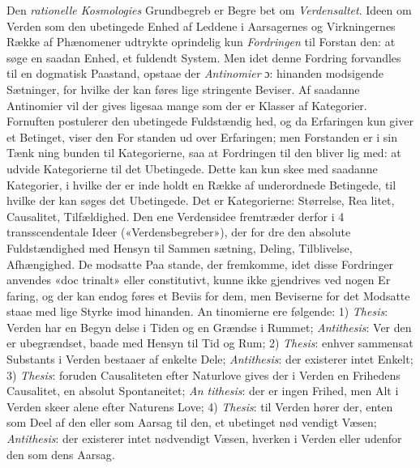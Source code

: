 \documentclass[12pt,a4paper]{book}
\begin{document}
Den \emph{rationelle Kosmologies} Grundbegreb er Begre\-%
bet om \emph{Verdensaltet}. Ideen om Verden som den ubetingede
Enhed af Leddene i Aarsagernes og Virkningernes Række af
Phænomener udtrykte oprindelig kun \emph{Fordringen} til Forstan\-%
den: at søge en saadan Enhed, et fuldendt System. Men idet
denne Fordring forvandles til en dogmatisk Paastand, opstaae
der \emph{Antinomier} ɔ: hinanden modsigende Sætninger, for
hvilke der kan føres lige stringente Beviser. Af saadanne
Antinomier vil der gives ligesaa mange som der er Klasser af
Kategorier. Fornuften postulerer den ubetingede Fuldstændig\-%
hed, og da Erfaringen kun giver et Betinget, viser den For\-%
standen ud over Erfaringen; men Forstanden er i sin Tænk\-%
ning bunden til Kategorierne, saa at Fordringen til den bliver
lig med: at udvide Kategorierne til det Ubetingede. Dette
kan kun skee med saadanne Kategorier, i hvilke der er inde\-%
holdt en Række af underordnede Betingede, til hvilke der kan
søges det Ubetingede. Det er Kategorierne: Størrelse, Rea\-%
litet, Causalitet, Tilfældighed. Den ene Verdensidee fremtræder
derfor i 4 transscendentale Ideer («Verdensbegreber»), der for\-%
dre den absolute Fuldstændighed med Hensyn til Sammen\-%
sætning, Deling, Tilblivelse, Afhængighed. De modsatte Paa\-%
stande, der fremkomme, idet disse Fordringer anvendes «doc\-%
trinalt» eller constitutivt, kunne ikke gjendrives ved nogen Er\-%
faring, og der kan endog føres et Beviis for dem, men Beviserne
for det Modsatte staae med lige Styrke imod hinanden. An\-%
tinomierne ere følgende: 1) \emph{Thesis}: Verden har en Begyn\-%
delse i Tiden og en Grændse i Rummet; \emph{Antithesis}: Ver\-%
den er ubegrændset, baade med Hensyn til Tid og Rum; 2)
\emph{Thesis}: enhver sammensat Substants i Verden bestaaer af
enkelte Dele; \emph{Antithesis}: der existerer intet Enkelt; 3)
\emph{Thesis}: foruden Causaliteten efter Naturlove gives der i
Verden en Frihedens Causalitet, en absolut Spontaneitet; \emph{An\-%
tithesis}: der er ingen Frihed, men Alt i Verden skeer alene
efter Naturens Love; 4) \emph{Thesis}: til Verden hører der, enten
som Deel af den eller som Aarsag til den, et ubetinget nød\-%
vendigt Væsen; \emph{Antithesis}: der existerer intet nødvendigt
Væsen, hverken i Verden eller udenfor den som dens Aarsag.
\end{document}
